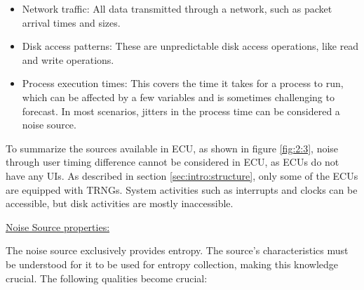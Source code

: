 \begin{description}
\begin{itemize}
		\item Network traffic: All data transmitted through a network, such as packet arrival times and sizes.
	
		\item Disk access patterns: These are unpredictable disk access operations, like read and write operations.
	
		\item Process execution times: This covers the time it takes for a process to run, which can be affected by a few variables and is sometimes challenging to forecast. In most scenarios, jitters in the process time can be considered a noise source.		
		
	\end{itemize}
\end{description}

To summarize the sources available in ECU, as shown in figure \ref{fig:2:3}, noise through user timing difference cannot be considered in ECU, as ECUs do not have any UIs. As described in section \ref{sec:intro:structure}, only some of the ECUs are equipped with TRNGs. System activities such as interrupts and clocks can be accessible, but disk activities are mostly inaccessible.

\underline{Noise Source properties:}

The noise source exclusively provides entropy. The source’s characteristics must be understood for it to be used for entropy collection, making this knowledge crucial. The following qualities become crucial:

